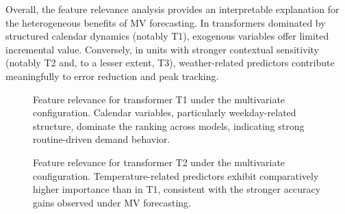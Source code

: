 Overall, the feature relevance analysis provides an interpretable explanation for the heterogeneous benefits of MV forecasting. In transformers dominated by structured calendar dynamics (notably T1), exogenous variables offer limited incremental value. Conversely, in units with stronger contextual sensitivity (notably T2 and, to a lesser extent, T3), weather-related predictors contribute meaningfully to error reduction and peak tracking.

\begin{figure}[t]
\centering
\begin{subfigure}[t]{0.32\textwidth}
    \centering
    
\end{subfigure}
\begin{subfigure}[t]{0.32\textwidth}
    \centering
    
\end{subfigure}
\begin{subfigure}[t]{0.32\textwidth}
    \centering
    
\end{subfigure}
\caption{Feature relevance for transformer T1 under the multivariate configuration. Calendar variables, particularly weekday-related structure, dominate the ranking across models, indicating strong routine-driven demand behavior.}
\label{fig:importance_T21a}
\end{figure}

\begin{figure}[t]
\centering
\begin{subfigure}[t]{0.32\textwidth}
    \centering
    
\end{subfigure}
\begin{subfigure}[t]{0.32\textwidth}
    \centering
    
\end{subfigure}
\begin{subfigure}[t]{0.32\textwidth}
    \centering
    
\end{subfigure}
\caption{Feature relevance for transformer T2 under the multivariate configuration. Temperature-related predictors exhibit comparatively higher importance than in T1, consistent with the stronger accuracy gains observed under MV forecasting.}
\label{fig:importance_T22a}
\end{figure}

